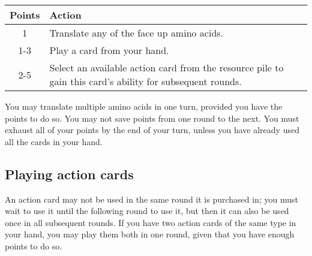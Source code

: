 \documentclass[a4paper,11pt,oneside]{memoir}
\begin{document}
\begin{table}[h!]
\begin{tabular}{cl}
\hline
\textbf{Points} & \textbf{Action}\\
\hline
    1    & Translate any of the face up amino acids.\\
    1-3  & Play a card from your hand.\\
    2-5  & Select an available action card from the resource pile to gain this card's ability for subsequent rounds.\\
\hline
\end{tabular}
\label{turntable}
\end{table}

You may translate multiple amino acids in one turn, provided you have the points to do so.
You may not save points from one round to the next.
You must exhaust all of your points by the end of your turn, unless you have already used all the cards in your hand.

\subsection*{Playing action cards}
An action card may not be used in the same round it is purchased in; you must wait to use it until the following round to use it, but then it can also be used once in all subsequent rounds.
If you have two action cards of the same type in your hand, you may play them both in one round, given that you have enough points to do so. 
\end{document}
